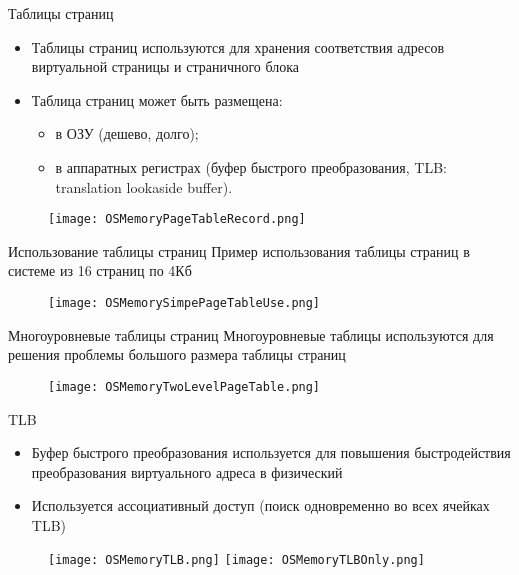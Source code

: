 \documentclass[aspectratio=169,14pt]{beamer}
\begin{document}
\begin{frame}{Таблицы страниц}
    \begin{itemize}
        \item Таблицы страниц используются для хранения соответствия
        адресов виртуальной страницы и страничного блока
        \item Таблица страниц может быть размещена:
        \begin{itemize}
            \item в ОЗУ (дешево, долго);
            \item в аппаратных регистрах (буфер быстрого преобразования,
            TLB: translation lookaside buffer).
        \end{itemize}
   \end{itemize}
   \begin{figure}[htp]
    \centering
    \texttt{[image: OSMemoryPageTableRecord.png]}
    \end{figure}
\end{frame}

\begin{frame}{Использование таблицы страниц}
    Пример использования таблицы страниц в системе из 16 страниц по 4Кб
    \begin{figure}[htp]
        \centering
        \texttt{[image: OSMemorySimpePageTableUse.png]}
    \end{figure}
\end{frame}

\begin{frame}{Многоуровневые таблицы страниц}
    Многоуровневые таблицы используются для решения проблемы
    большого размера таблицы страниц
    \begin{figure}[htp]
        \centering
        \texttt{[image: OSMemoryTwoLevelPageTable.png]}
    \end{figure}
\end{frame}

\begin{frame}{TLB}
    \begin{footnotesize}
    \begin{itemize}
        \item Буфер быстрого преобразования используется для повышения
        быстродействия преобразования виртуального адреса в физический
        \item Используется ассоциативный доступ (поиск одновременно во
        всех ячейках TLB)
    \end{itemize}
    \end{footnotesize}
    \begin{figure}[htp]
        \centering
        \texttt{[image: OSMemoryTLB.png]}
        \texttt{[image: OSMemoryTLBOnly.png]}
    \end{figure}
\end{frame}
\end{document}
